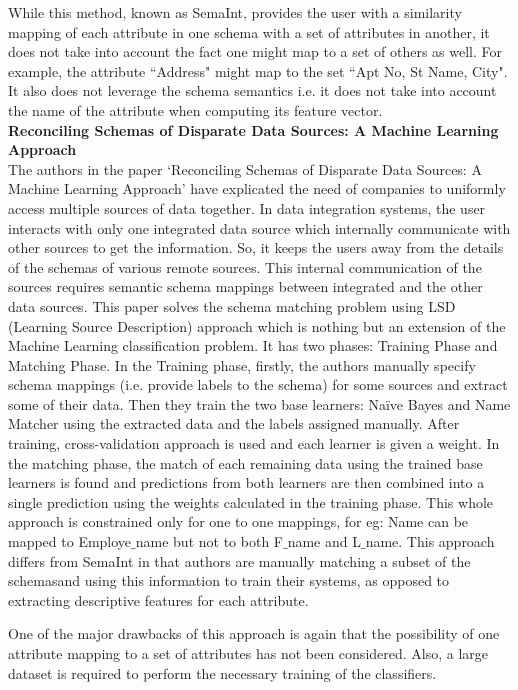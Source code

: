 \documentclass{article}
\begin{document}
While this method, known as SemaInt, provides the user with a similarity mapping of each attribute in one schema with a set of attributes in another, it does not take into account the fact one might map to a set of others as well. For example, the attribute ``Address" might map to the set ``Apt No, St Name, City". It also does not leverage the schema semantics i.e. it does not take into account the name of the attribute when computing its feature vector.\\

\noindent
\textbf{Reconciling Schemas of Disparate Data Sources: A Machine Learning Approach}\cite{ref1}\\
The authors in the paper ‘Reconciling Schemas of Disparate Data Sources: A Machine Learning Approach’ have explicated the need of companies to uniformly access multiple sources of data together. In data integration systems, the user interacts with only one integrated data source which internally communicate with other sources to get the information. So, it keeps the users away from the details of the schemas of various remote sources. This internal communication of the sources requires semantic schema mappings between integrated and the other data sources. This paper solves the schema matching problem using LSD (Learning Source Description) approach which is nothing but an extension of the Machine Learning classification problem. It has two phases: Training Phase and Matching Phase. In the Training phase, firstly, the authors manually specify schema mappings (i.e. provide labels to the schema) for some sources and extract some of their data. Then they train the two base learners: Naïve Bayes and Name Matcher using the extracted data and the labels assigned manually. After training, cross-validation approach is used and each learner is given a weight. In the matching phase, the match of each remaining data using the trained base learners is found and predictions from both learners are then combined into a single prediction using the weights calculated in the training phase. This whole approach is constrained only for one to one mappings, for eg: Name can be mapped to Employe$\_$name but not to both F$\_$name and L$\_$name. This approach differs from SemaInt in that authors are manually matching a subset of the schemasand using this information to train their systems, as opposed to extracting descriptive features for each attribute.

One of the major drawbacks of this approach is again that the possibility of one attribute mapping to a set of attributes has not been considered. Also, a large dataset is required to perform the necessary training of the classifiers.\\
\end{document}
